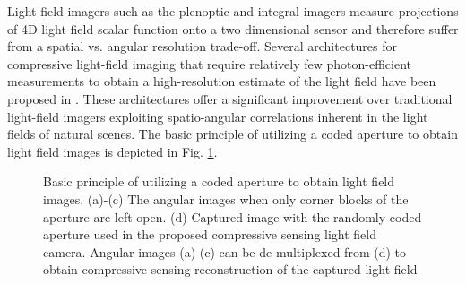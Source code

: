 \documentclass[journal]{IEEEtran}
\begin{document}
Light field imagers such as the plenoptic and integral imagers measure projections of 4D light field scalar function onto a two dimensional sensor and therefore suffer from a spatial vs. angular resolution trade-off. Several architectures for compressive light-field imaging that require relatively few photon-efficient measurements to obtain a high-resolution estimate of the light field have been proposed in \cite{Ashok2010, Babacan2012, Marwah2013}. These architectures offer a significant improvement over traditional light-field imagers exploiting spatio-angular correlations inherent in the light fields of natural scenes. The basic principle of utilizing a coded aperture to obtain light field images is depicted in Fig. \ref{fig:light_field_cs}.
%
\begin{figure}
	\centering
	
	\caption{Basic principle of utilizing a coded aperture to obtain light field images. (a)-(c) The angular images when only corner blocks of the aperture are left open. (d) Captured image with the randomly coded aperture used in the proposed compressive sensing light field camera. Angular images (a)-(c) can be de-multiplexed from (d) to obtain compressive sensing reconstruction of the captured light field \cite{Babacan2012}}
	
	\label{fig:light_field_cs}
\end{figure}
\end{document}
